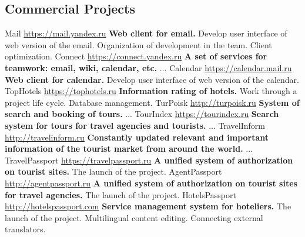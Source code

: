 \documentclass[11pt,a4paper]{moderncv}
\begin{document}
  \subsection{Commercial Projects}
  \cvline
    {Mail}
    {\url{https://mail.yandex.ru}\newline{}
    \textbf{Web client for email.}\newline{}
    Develop user interface of web version of the email.\newline{}
    Organization of development in the team.\newline{}
    Client optimization.}
  \cvline
    {Connect}
    {\url{https://connect.yandex.ru}\newline{}
    \textbf{A set of services for teamwork: email, wiki, calendar, etc.}\newline{}
    ...}
  \cvline
    {Calendar}
    {\url{https://calendar.mail.ru}\newline{}
    \textbf{Web client for calendar.}\newline{}
    Develop user interface of web version of the calendar.}
  \cvline
    {TopHotels}
    {\url{https://tophotels.ru}\newline{}
    \textbf{Information rating of hotels.}\newline{}
    Work through a project life cycle. Database management.}
  \cvline
    {TurPoisk}
    {\url{http://turpoisk.ru}\newline{}
    \textbf{System of search and booking of tours.}\newline{}
    ...}
  \cvline
    {TourIndex}
    {\url{https://tourindex.ru}\newline{}
    \textbf{Search system for tours for travel agencies and tourists.}\newline{}
    ...}
  \cvline
    {TravelInform}
    {\url{http://travelinform.ru}\newline{}
    \textbf{Constantly updated relevant and important information of the tourist market from around the world.}\newline{}
    ...}
  \cvline
    {TravelPassport}
    {\url{https://travelpassport.ru}\newline{}
    \textbf{A unified system of authorization on tourist sites.}\newline{}
    The launch of the project.}
  \cvline
    {AgentPassport}
    {\url{http://agentpassport.ru}\newline{}
    \textbf{A unified system of authorization on tourist sites for travel agencies.}\newline{}
    The launch of the project.}
  \cvline
    {HotelsPassport}
    {\url{http://hotelspassport.com}\newline{}
    \textbf{Service management system for hoteliers.}\newline{}
    The launch of the project.\newline{}
    Multilingual content editing. Connecting external translators.}
\end{document}
